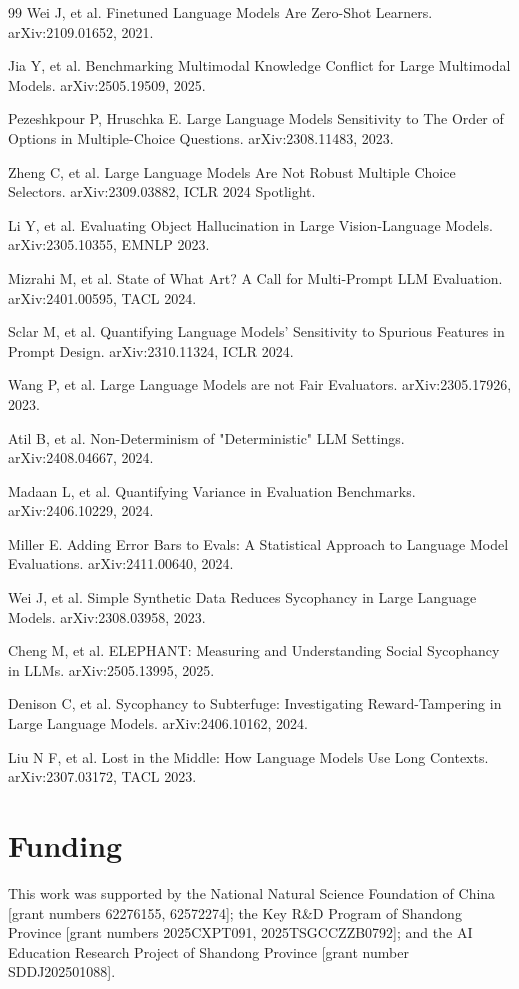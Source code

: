 \documentclass[pdflatex,sn-basic,Numbered]{sn-jnl}
\theoremstyle{thmstyleone}
\theoremstyle{thmstyletwo}
\theoremstyle{thmstylethree}
\begin{document}
\begin{thebibliography}{99}
Wei J, et al. Finetuned Language Models Are Zero-Shot Learners. arXiv:2109.01652, 2021.

Jia Y, et al. Benchmarking Multimodal Knowledge Conflict for Large Multimodal Models. arXiv:2505.19509, 2025.

Pezeshkpour P, Hruschka E. Large Language Models Sensitivity to The Order of Options in Multiple-Choice Questions. arXiv:2308.11483, 2023.

Zheng C, et al. Large Language Models Are Not Robust Multiple Choice Selectors. arXiv:2309.03882, ICLR 2024 Spotlight.

Li Y, et al. Evaluating Object Hallucination in Large Vision-Language Models. arXiv:2305.10355, EMNLP 2023.

Mizrahi M, et al. State of What Art? A Call for Multi-Prompt LLM Evaluation. arXiv:2401.00595, TACL 2024.

Sclar M, et al. Quantifying Language Models' Sensitivity to Spurious Features in Prompt Design. arXiv:2310.11324, ICLR 2024.

Wang P, et al. Large Language Models are not Fair Evaluators. arXiv:2305.17926, 2023.

Atil B, et al. Non-Determinism of "Deterministic" LLM Settings. arXiv:2408.04667, 2024.

Madaan L, et al. Quantifying Variance in Evaluation Benchmarks. arXiv:2406.10229, 2024.

Miller E. Adding Error Bars to Evals: A Statistical Approach to Language Model Evaluations. arXiv:2411.00640, 2024.

Wei J, et al. Simple Synthetic Data Reduces Sycophancy in Large Language Models. arXiv:2308.03958, 2023.

Cheng M, et al. ELEPHANT: Measuring and Understanding Social Sycophancy in LLMs. arXiv:2505.13995, 2025.

Denison C, et al. Sycophancy to Subterfuge: Investigating Reward-Tampering in Large Language Models. arXiv:2406.10162, 2024.

Liu N F, et al. Lost in the Middle: How Language Models Use Long Contexts. arXiv:2307.03172, TACL 2023.

\end{thebibliography}

\section*{Funding}
This work was supported by the National Natural Science Foundation of China [grant numbers 62276155, 62572274]; the Key R\&D Program of Shandong Province [grant numbers 2025CXPT091, 2025TSGCCZZB0792]; and the AI Education Research Project of Shandong Province [grant number SDDJ202501088].
\end{document}
